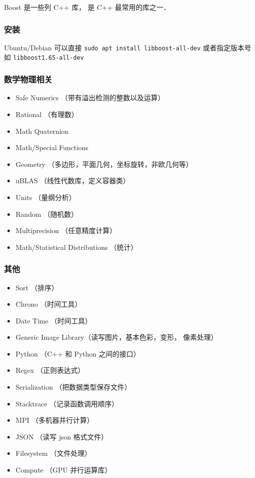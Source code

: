 
Boost 是一些列 C++ 库， 是 C++ 最常用的库之一．

\subsubsection{安装}
Ubuntu/Debian 可以直接 \verb|sudo apt install libboost-all-dev| 或者指定版本号如 \verb|libboost1.65-all-dev|

\subsubsection{数学物理相关}
\begin{itemize}
\item Safe Numerics （带有溢出检测的整数以及运算）
\item Rational （有理数）
\item Math Quaternion
\item Math/Special Functions
\item Geometry （多边形，平面几何，坐标旋转，非欧几何等）
\item uBLAS （线性代数库，定义容器类）
\item Units （量纲分析）
\item Random （随机数）
\item Multiprecision （任意精度计算）
\item Math/Statistical Distributions （统计）
\end{itemize}

\subsubsection{其他}
\begin{itemize}
\item Sort （排序）
\item Chrono （时间工具）
\item Date Time （时间工具）
\item Generic Image Library（读写图片，基本色彩，变形， 像素处理）
\item Python （C++ 和 Python 之间的接口）
\item Regex （正则表达式）
\item Serialization （把数据类型保存文件）
\item Stacktrace （记录函数调用顺序）
\item MPI （多机器并行计算）
\item JSON （读写 json 格式文件）
\item Filesystem （文件处理）
\item Compute （GPU 并行运算库）
\end{itemize}


